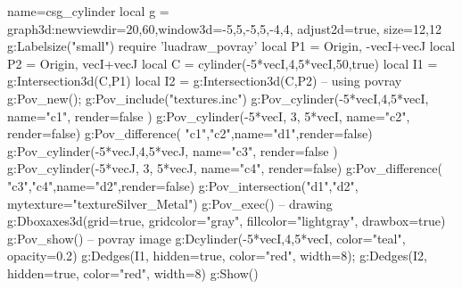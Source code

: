 \documentclass[border=5pt]{standalone}
\begin{document}
\begin{luadraw}{name=csg_cylinder}
local g = graph3d:new{viewdir={20,60},window3d={-5,5,-5,5,-4,4}, adjust2d=true, size={12,12}}
g:Labelsize("small")
require 'luadraw_povray'
local P1 = {Origin, -vecI+vecJ}
local P2 = {Origin, vecI+vecJ}
local C = cylinder(-5*vecI,4,5*vecI,50,true)
local I1 = g:Intersection3d(C,P1)
local I2 = g:Intersection3d(C,P2)
-- using povray
g:Pov_new(); g:Pov_include("textures.inc")
g:Pov_cylinder(-5*vecI,4,5*vecI,{ name="c1", render=false })
g:Pov_cylinder(-5*vecI, 3, 5*vecI, {name="c2", render=false})
g:Pov_difference( {"c1","c2"},{name="d1",render=false})
g:Pov_cylinder(-5*vecJ,4,5*vecJ,{ name="c3", render=false })
g:Pov_cylinder(-5*vecJ, 3, 5*vecJ, {name="c4", render=false})
g:Pov_difference( {"c3","c4"},{name="d2",render=false})
g:Pov_intersection({"d1","d2"}, {mytexture="texture{Silver_Metal}"})
g:Pov_exec()
-- drawing
g:Dboxaxes3d({grid=true, gridcolor="gray", fillcolor="lightgray", drawbox=true})
g:Pov_show() -- povray  image
g:Dcylinder(-5*vecI,4,5*vecI, {color="teal", opacity=0.2})
g:Dedges(I1, {hidden=true, color="red", width=8}); g:Dedges(I2, {hidden=true, color="red", width=8})
g:Show()
\end{luadraw}
\end{document}
